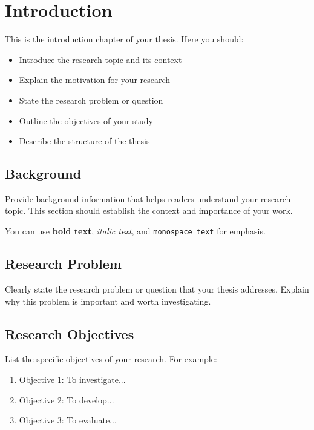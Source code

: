 
\chapter{Introduction}
\label{introduction}
\thispagestyle{empty}


This is the introduction chapter of your thesis. Here you should:

\begin{itemize}
    \item Introduce the research topic and its context
    \item Explain the motivation for your research
    \item State the research problem or question
    \item Outline the objectives of your study
    \item Describe the structure of the thesis
\end{itemize}

\section{Background}

Provide background information that helps readers understand your research topic. This section should establish the context and importance of your work.

You can use \textbf{bold text}, \textit{italic text}, and \texttt{monospace text} for emphasis.

\section{Research Problem}

Clearly state the research problem or question that your thesis addresses. Explain why this problem is important and worth investigating.

\section{Research Objectives}

List the specific objectives of your research. For example:

\begin{enumerate}
    \item Objective 1: To investigate...
    \item Objective 2: To develop...
    \item Objective 3: To evaluate...
\end{enumerate}

